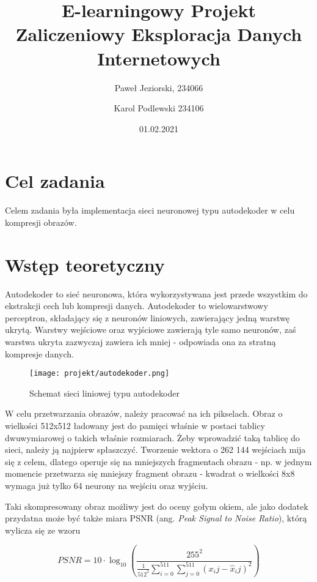 \documentclass[12pt]{article}
\title{{\bf E-learningowy Projekt Zaliczeniowy}\linebreak
Eksploracja Danych Internetowych}
\author{Paweł Jeziorski, 234066 \and Karol Podlewski 234106}
\date{01.02.2021}
\begin{document}
\clearpage\maketitle
\thispagestyle{empty}
\newpage
\setcounter{page}{1}
\section{Cel zadania}

Celem zadania była implementacja sieci neuronowej typu autodekoder w celu kompresji obrazów.

\section{Wstęp teoretyczny}

Autodekoder to sieć neuronowa, która wykorzystywana jest przede wszystkim do ekstrakcji cech lub kompresji danych. Autodekoder to wielowarstwowy perceptron, składający się z neuronów liniowych, zawierający jedną warstwę ukrytą. Warstwy wejściowe oraz wyjściowe zawierają tyle samo neuronów, zaś warstwa ukryta zazwyczaj zawiera ich mniej - odpowiada ona za stratną kompresje danych.

\begin{figure}[H]
 \centering
 \texttt{[image: projekt/autodekoder.png]}
 \vspace{-0.1cm}
 \caption{Schemat sieci liniowej typu autodekoder \cite{instrukcja}}
 \label{FFT}
\end{figure}

W celu przetwarzania obrazów, należy pracować na ich pikselach. Obraz o wielkości 512x512 ładowany jest do pamięci właśnie w postaci tablicy dwuwymiarowej o takich właśnie rozmiarach. Żeby wprowadzić taką tablicę do sieci, należy ją najpierw spłaszczyć. Tworzenie wektora o 262 144 wejściach mija się z celem, dlatego operuje się na mniejszych fragmentach obrazu - np. w jednym momencie przetwarza się mniejszy fragment obrazu - kwadrat o wielkości 8x8 wymaga już tylko 64 neurony na wejściu oraz wyjściu.

Taki skompresowany obraz możliwy jest do oceny gołym okiem, ale jako dodatek przydatna może być także miara PSNR (ang. \textit{Peak Signal to Noise Ratio}), którą wylicza się ze wzoru

\begin{equation}
PSNR = 10 \cdot \log_{10} \left(\frac{255^2}{\frac{1}{512^2}\sum_{i=0}^{511}\sum_{j=0}^{511}(x_ij - \hat{x}_ij)^2} \right)
\end{equation}
\end{document}
